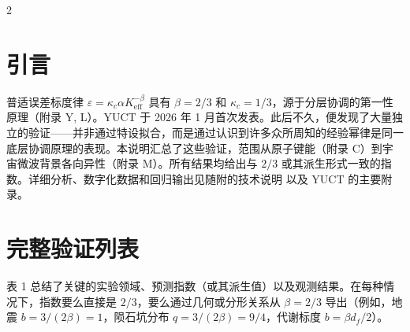 \documentclass[11pt,a4paper]{article}
\newcommand{\eps}{\varepsilon}
\newcommand{\kappac}{\kappa_c}
\newcommand{\Keff}{K_{\mathrm{eff}}}
\newcommand{\betaf}{\beta}
\begin{document}
	\vspace{0.4cm}
	\vspace*{-\baselineskip}
	\begin{multicols}{2}
		
		\section{引言}
		
		普适误差标度律 \(\eps = \kappac \alpha \Keff^{-\betaf}\) 具有 \(\betaf = 2/3\) 和 \(\kappac = 1/3\)，源于分层协调的第一性原理（附录 Y, L）。YUCT 于 2026 年 1 月首次发表。此后不久，便发现了大量独立的验证——并非通过特设拟合，而是通过认识到许多众所周知的经验幂律是同一底层协调原理的表现。本说明汇总了这些验证，范围从原子键能（附录 C）到宇宙微波背景各向异性（附录 M）。所有结果均给出与 \(2/3\) 或其派生形式一致的指数。详细分析、数字化数据和回归输出见随附的技术说明 \cite{TN1,TN2,TN3,TN4,TN5} 以及 YUCT 的主要附录。
		
		\section{完整验证列表}
		
		表 1 总结了关键的实验领域、预测指数（或其派生值）以及观测结果。在每种情况下，指数要么直接是 \(2/3\)，要么通过几何或分形关系从 \(\betaf = 2/3\) 导出（例如，地震 \(b = 3/(2\betaf) = 1\)，陨石坑分布 \(q = 3/(2\betaf) = 9/4\)，代谢标度 \(b = \betaf d_f/2\)）。
		

\end{multicols}
\end{document}
